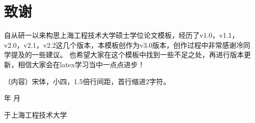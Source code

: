 \chapter{致谢}
自从研一以来构思上海工程技术大学硕士学位论文模板，经历了v1.0，v1.1，v2.0，v2.1，v2.2这几个版本，本模板创作为v3.0版本，创作过程中非常感谢冷同学提及的一些建议。
也希望大家在这个模板中找到一些不足之处，再进行版本更新，相信大家会在latex学习当中一点点进步！

（内容）宋体，小四，1.5倍行间距，首行缩进2字符。

\begin{flushright}
    \number\year    年 \number\month  月
    
    于上海工程技术大学
\end{flushright}

